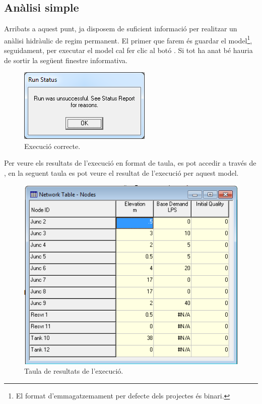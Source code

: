 \documentclass[12pt]{article}
\begin{document}
\subsection{Anàlisi simple}
Arribats a aquest punt, ja disposem de suficient informació per realitzar un anàlisi hidràulic de regim permanent. El primer que farem és guardar el model\footnote{El format d'emmagatzemament per defecte dels projectes és binari.}, seguidament, per executar el model cal fer clic al botó . Si tot ha anat bé hauria de sortir la següent finestre informativa.
\begin{figure}[h!]
	\centering
	\includegraphics[scale=.5]{imatges/epanet/12.png}
	\caption{Execució correcte.}
\end{figure}
Per veure els resultats de l'execució en format de taula, es pot accedir a través de , en la seguent taula es pot veure el resultat de l'execució per aquest model.
\begin{figure}[h!]
	\centering
	\includegraphics[scale=.5]{imatges/epanet/13.png}
	\caption{Taula de resultats de l'execució.}
\end{figure}

\pagebreak
\end{document}
